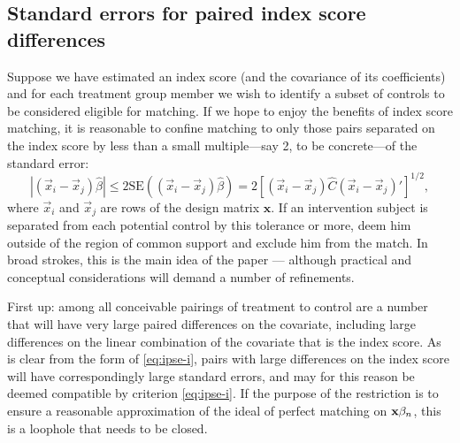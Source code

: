\documentclass{article}
\theoremstyle{remark}
\begin{document}
\subsection{Standard errors for paired index score differences}
Suppose we have estimated an index score (and the covariance of its
coefficients) and for each treatment group member we wish to identify a
subset of controls to be considered eligible for matching. If we hope to
enjoy the benefits of index score matching, it is reasonable to
confine matching to only those pairs separated on the index score
by less than a small multiple---say 2, to be concrete---of the standard error:
\begin{equation}
|(\vec{x}_i - \vec{x}_j)\hat{\beta}| \leq 2 \mathrm{SE}\left( (\vec{x}_i - \vec{x}_j)\hat{\beta}\right) = 2\left[  (\vec{x}_i - \vec{x}_j)\hat{C}(\vec{x}_i - \vec{x}_j)' \right]^{1/2},
\label{eq:ipse-i}
\end{equation}
where $\vec{x}_i$ and $\vec{x}_j$ are rows of the design matrix
$\mathbf{x}$. If an intervention subject is separated from each
potential control by this tolerance or more, deem him outside of the
region of common support and exclude him from the match.  In broad
strokes, this is the main idea of the paper --- although practical and
conceptual considerations will demand a number of refinements.

First up: among all conceivable pairings of treatment to control are a
number that will have very large paired differences on the covariate,
including large differences on the linear combination of the covariate
that is the index score. As is clear from the form of
\eqref{eq:ipse-i}, pairs with large differences on the index score
will have correspondingly large standard errors, and may for this reason
be deemed compatible by criterion \eqref{eq:ipse-i}. If the
purpose of the restriction is to ensure a reasonable approximation of the
ideal of perfect matching on $\mathbf{x}\beta_{n }$, this is a loophole that
needs to be closed. 
\end{document}
